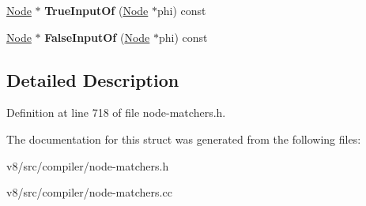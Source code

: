 \begin{DoxyCompactItemize}
\item 
\mbox{\label{structv8_1_1internal_1_1compiler_1_1DiamondMatcher_a3818c7c97dce2d86e9c9092bce94753a}} 
\mbox{\hyperlink{classv8_1_1internal_1_1compiler_1_1Node}{Node}} $\ast$ {\bfseries True\+Input\+Of} (\mbox{\hyperlink{classv8_1_1internal_1_1compiler_1_1Node}{Node}} $\ast$phi) const
\item 
\mbox{\label{structv8_1_1internal_1_1compiler_1_1DiamondMatcher_aeb1936dc3b94ed223e32f485d55e8b85}} 
\mbox{\hyperlink{classv8_1_1internal_1_1compiler_1_1Node}{Node}} $\ast$ {\bfseries False\+Input\+Of} (\mbox{\hyperlink{classv8_1_1internal_1_1compiler_1_1Node}{Node}} $\ast$phi) const
\end{DoxyCompactItemize}


\subsection{Detailed Description}


Definition at line 718 of file node-\/matchers.\+h.



The documentation for this struct was generated from the following files\+:\begin{DoxyCompactItemize}
\item 
v8/src/compiler/node-\/matchers.\+h\item 
v8/src/compiler/node-\/matchers.\+cc\end{DoxyCompactItemize}
